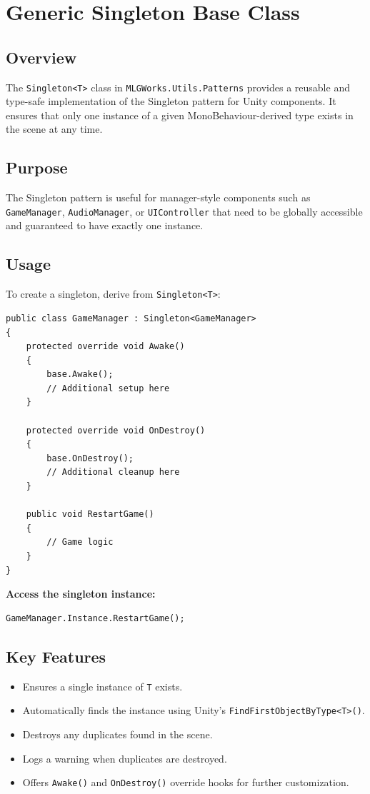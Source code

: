 \section{Generic Singleton Base Class}
\label{sec:singleton}

\subsection{Overview}
The \texttt{Singleton<T>} class in \texttt{MLGWorks.Utils.Patterns} provides a reusable and type-safe implementation of the Singleton pattern for Unity components. It ensures that only one instance of a given MonoBehaviour-derived type exists in the scene at any time.

\subsection{Purpose}
The Singleton pattern is useful for manager-style components such as \texttt{GameManager}, \texttt{AudioManager}, or \texttt{UIController} that need to be globally accessible and guaranteed to have exactly one instance.

\subsection{Usage}
To create a singleton, derive from \texttt{Singleton<T>}:

\begin{verbatim}
public class GameManager : Singleton<GameManager>
{
    protected override void Awake()
    {
        base.Awake();
        // Additional setup here
    }

    protected override void OnDestroy()
    {
        base.OnDestroy();
        // Additional cleanup here
    }

    public void RestartGame()
    {
        // Game logic
    }
}
\end{verbatim}

\textbf{Access the singleton instance:}
\begin{verbatim}
GameManager.Instance.RestartGame();
\end{verbatim}

\subsection{Key Features}
\begin{itemize}
    \item Ensures a single instance of \texttt{T} exists.
    \item Automatically finds the instance using Unity’s \texttt{FindFirstObjectByType<T>()}.
    \item Destroys any duplicates found in the scene.
    \item Logs a warning when duplicates are destroyed.
    \item Offers \texttt{Awake()} and \texttt{OnDestroy()} override hooks for further customization.
\end{itemize}

